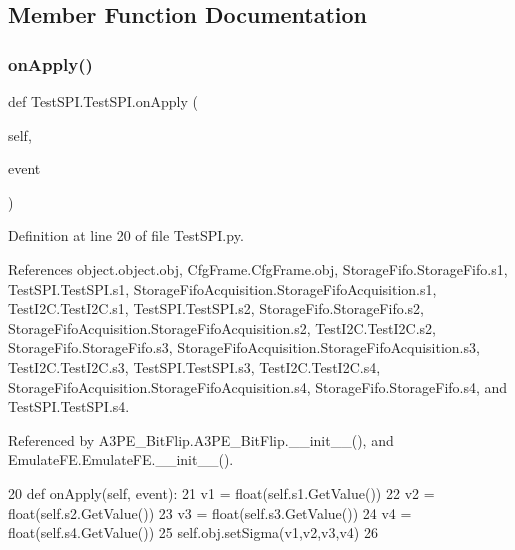 \subsection{Member Function Documentation}
\mbox{\label{classTestSPI_1_1TestSPI_afb81e2aa5e79d416c526e5a468a233c7}} 
\subsubsection{\texorpdfstring{on\+Apply()}{onApply()}}
{\footnotesize\ttfamily def Test\+S\+P\+I.\+Test\+S\+P\+I.\+on\+Apply (\begin{DoxyParamCaption}\item[{}]{self,  }\item[{}]{event }\end{DoxyParamCaption})}



Definition at line 20 of file Test\+S\+P\+I.\+py.



References object.\+object.\+obj, Cfg\+Frame.\+Cfg\+Frame.\+obj, Storage\+Fifo.\+Storage\+Fifo.\+s1, Test\+S\+P\+I.\+Test\+S\+P\+I.\+s1, Storage\+Fifo\+Acquisition.\+Storage\+Fifo\+Acquisition.\+s1, Test\+I2\+C.\+Test\+I2\+C.\+s1, Test\+S\+P\+I.\+Test\+S\+P\+I.\+s2, Storage\+Fifo.\+Storage\+Fifo.\+s2, Storage\+Fifo\+Acquisition.\+Storage\+Fifo\+Acquisition.\+s2, Test\+I2\+C.\+Test\+I2\+C.\+s2, Storage\+Fifo.\+Storage\+Fifo.\+s3, Storage\+Fifo\+Acquisition.\+Storage\+Fifo\+Acquisition.\+s3, Test\+I2\+C.\+Test\+I2\+C.\+s3, Test\+S\+P\+I.\+Test\+S\+P\+I.\+s3, Test\+I2\+C.\+Test\+I2\+C.\+s4, Storage\+Fifo\+Acquisition.\+Storage\+Fifo\+Acquisition.\+s4, Storage\+Fifo.\+Storage\+Fifo.\+s4, and Test\+S\+P\+I.\+Test\+S\+P\+I.\+s4.



Referenced by A3\+P\+E\+\_\+\+Bit\+Flip.\+A3\+P\+E\+\_\+\+Bit\+Flip.\+\_\+\+\_\+init\+\_\+\+\_\+(), and Emulate\+F\+E.\+Emulate\+F\+E.\+\_\+\+\_\+init\+\_\+\+\_\+().


\begin{DoxyCode}
20     \textcolor{keyword}{def }onApply(self, event):
21         v1 = float(self.s1.GetValue())
22         v2 = float(self.s2.GetValue())
23         v3 = float(self.s3.GetValue())
24         v4 = float(self.s4.GetValue())
25         self.obj.setSigma(v1,v2,v3,v4)
26 
\end{DoxyCode}
\mbox{\label{classTestSPI_1_1TestSPI_a3decf34e1dd0ad00ae1a53d5daf690b1}} 
